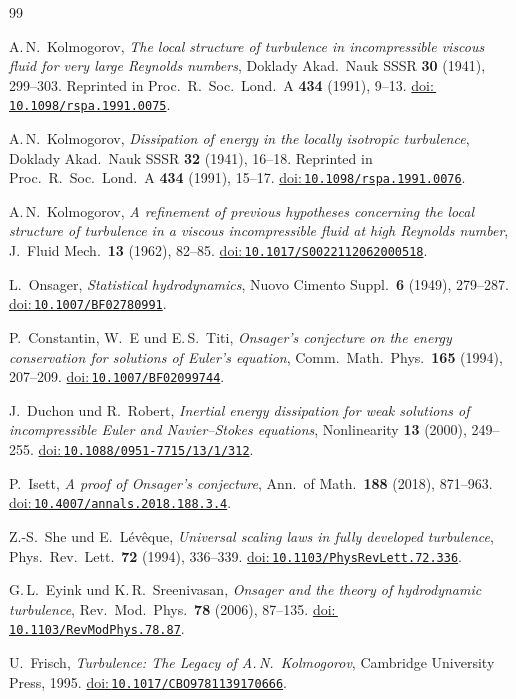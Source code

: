 \documentclass[12pt,a4paper]{article}
\newcommand{\doilink}[1]{\href{https://doi.org/#1}{doi:\,\nolinkurl{#1}}}
\theoremstyle{breakdef}
\theoremstyle{breakplain}
\theoremstyle{breakdef}
\begin{document}
{}
\begin{thebibliography}{99}
\sloppy
\setlength{\emergencystretch}{3em}

A.\,N.~Kolmogorov,
\emph{The local structure of turbulence in incompressible viscous fluid
for very large Reynolds numbers},
Doklady Akad.\ Nauk SSSR \textbf{30} (1941), 299--303.
Reprinted in Proc.\ R.\ Soc.\ Lond.\ A \textbf{434} (1991), 9--13.
\doilink{10.1098/rspa.1991.0075}.

A.\,N.~Kolmogorov,
\emph{Dissipation of energy in the locally isotropic turbulence},
Doklady Akad.\ Nauk SSSR \textbf{32} (1941), 16--18.
Reprinted in Proc.\ R.\ Soc.\ Lond.\ A \textbf{434} (1991), 15--17.
\doilink{10.1098/rspa.1991.0076}.

A.\,N.~Kolmogorov,
\emph{A refinement of previous hypotheses concerning the local structure
of turbulence in a viscous incompressible fluid at high Reynolds number},
J.~Fluid Mech.\ \textbf{13} (1962), 82--85.
\doilink{10.1017/S0022112062000518}.

L.~Onsager,
\emph{Statistical hydrodynamics},
Nuovo Cimento Suppl.\ \textbf{6} (1949), 279--287.
\doilink{10.1007/BF02780991}.

P.~Constantin, W.~E und E.\,S.~Titi,
\emph{Onsager's conjecture on the energy conservation for solutions of
Euler's equation},
Comm.\ Math.\ Phys.\ \textbf{165} (1994), 207--209.
\doilink{10.1007/BF02099744}.

J.~Duchon und R.~Robert,
\emph{Inertial energy dissipation for weak solutions of incompressible
Euler and Navier--Stokes equations},
Nonlinearity \textbf{13} (2000), 249--255.
\doilink{10.1088/0951-7715/13/1/312}.

P.~Isett,
\emph{A proof of Onsager's conjecture},
Ann.\ of Math.\ \textbf{188} (2018), 871--963.
\doilink{10.4007/annals.2018.188.3.4}.

Z.-S.~She und E.~Lévêque,
\emph{Universal scaling laws in fully developed turbulence},
Phys.\ Rev.\ Lett.\ \textbf{72} (1994), 336--339.
\doilink{10.1103/PhysRevLett.72.336}.

G.\,L.~Eyink und K.\,R.~Sreenivasan,
\emph{Onsager and the theory of hydrodynamic turbulence},
Rev.\ Mod.\ Phys.\ \textbf{78} (2006), 87--135.
\doilink{10.1103/RevModPhys.78.87}.

U.~Frisch,
\emph{Turbulence: The Legacy of A.\,N.\ Kolmogorov},
Cambridge University Press, 1995.
\doilink{10.1017/CBO9781139170666}.


\end{thebibliography}
\end{document}
